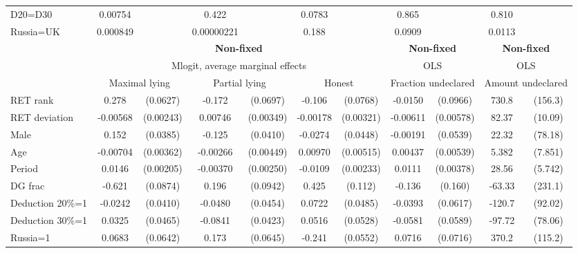 \begin{tabular}{l|cccccc|cc|cc}
D20=D30         &  0.00754         &         &    0.422         &         &   0.0783         &         &    0.865         &         &    0.810         &         \\
Russia=UK       & 0.000849         &         &0.00000221         &         &    0.188         &         &   0.0909         &         &   0.0113         &         \\
\hline\hline
&\multicolumn{6}{c|}{\bf Non-fixed}&\multicolumn{2}{c|}{\bf Non-fixed}&\multicolumn{2}{c}{\bf Non-fixed}\\ &\multicolumn{6}{c|}{Mlogit, average marginal effects }&\multicolumn{2}{c|}{OLS}&\multicolumn{2}{c}{OLS}\\
                &\multicolumn{2}{c}{Maximal lying}&\multicolumn{2}{c}{Partial lying}&\multicolumn{2}{c}{Honest}  &\multicolumn{2}{c}{Fraction undeclared}&\multicolumn{2}{c}{Amount undeclared}\\
\hline
RET rank        &    0.278\sym{***}& (0.0627)&   -0.172\sym{**} & (0.0697)&   -0.106         & (0.0768)&  -0.0150         & (0.0966)&    730.8\sym{***}&  (156.3)\\
RET deviation   & -0.00568\sym{**} &(0.00243)&  0.00746\sym{**} &(0.00349)& -0.00178         &(0.00321)& -0.00611         &(0.00578)&    82.37\sym{***}&  (10.09)\\
Male            &    0.152\sym{***}& (0.0385)&   -0.125\sym{***}& (0.0410)&  -0.0274         & (0.0448)& -0.00191         & (0.0539)&    22.32         &  (78.18)\\
Age             & -0.00704\sym{*}  &(0.00362)& -0.00266         &(0.00449)&  0.00970\sym{*}  &(0.00515)&  0.00437         &(0.00539)&    5.382         &  (7.851)\\
Period          &   0.0146\sym{***}&(0.00205)& -0.00370         &(0.00250)&  -0.0109\sym{***}&(0.00233)&   0.0111\sym{***}&(0.00378)&    28.56\sym{***}&  (5.742)\\
DG frac         &   -0.621\sym{***}& (0.0874)&    0.196\sym{**} & (0.0942)&    0.425\sym{***}&  (0.112)&   -0.136         &  (0.160)&   -63.33         &  (231.1)\\
Deduction 20\%=1&  -0.0242         & (0.0410)&  -0.0480         & (0.0454)&   0.0722         & (0.0485)&  -0.0393         & (0.0617)&   -120.7         &  (92.02)\\
Deduction 30\%=1&   0.0325         & (0.0465)&  -0.0841\sym{**} & (0.0423)&   0.0516         & (0.0528)&  -0.0581         & (0.0589)&   -97.72         &  (78.06)\\
Russia=1        &   0.0683         & (0.0642)&    0.173\sym{***}& (0.0645)&   -0.241\sym{***}& (0.0552)&   0.0716         & (0.0716)&    370.2\sym{***}&  (115.2)\\

\end{tabular}
